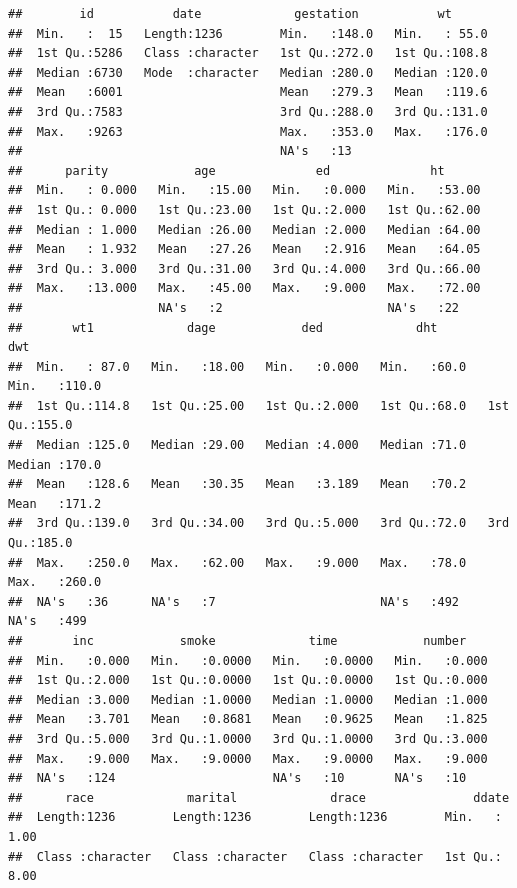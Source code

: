 \documentclass[
]{book}
\begin{document}
\begin{verbatim}
##        id           date             gestation           wt       
##  Min.   :  15   Length:1236        Min.   :148.0   Min.   : 55.0  
##  1st Qu.:5286   Class :character   1st Qu.:272.0   1st Qu.:108.8  
##  Median :6730   Mode  :character   Median :280.0   Median :120.0  
##  Mean   :6001                      Mean   :279.3   Mean   :119.6  
##  3rd Qu.:7583                      3rd Qu.:288.0   3rd Qu.:131.0  
##  Max.   :9263                      Max.   :353.0   Max.   :176.0  
##                                    NA's   :13                     
##      parity            age              ed              ht       
##  Min.   : 0.000   Min.   :15.00   Min.   :0.000   Min.   :53.00  
##  1st Qu.: 0.000   1st Qu.:23.00   1st Qu.:2.000   1st Qu.:62.00  
##  Median : 1.000   Median :26.00   Median :2.000   Median :64.00  
##  Mean   : 1.932   Mean   :27.26   Mean   :2.916   Mean   :64.05  
##  3rd Qu.: 3.000   3rd Qu.:31.00   3rd Qu.:4.000   3rd Qu.:66.00  
##  Max.   :13.000   Max.   :45.00   Max.   :9.000   Max.   :72.00  
##                   NA's   :2                       NA's   :22     
##       wt1             dage            ded             dht            dwt       
##  Min.   : 87.0   Min.   :18.00   Min.   :0.000   Min.   :60.0   Min.   :110.0  
##  1st Qu.:114.8   1st Qu.:25.00   1st Qu.:2.000   1st Qu.:68.0   1st Qu.:155.0  
##  Median :125.0   Median :29.00   Median :4.000   Median :71.0   Median :170.0  
##  Mean   :128.6   Mean   :30.35   Mean   :3.189   Mean   :70.2   Mean   :171.2  
##  3rd Qu.:139.0   3rd Qu.:34.00   3rd Qu.:5.000   3rd Qu.:72.0   3rd Qu.:185.0  
##  Max.   :250.0   Max.   :62.00   Max.   :9.000   Max.   :78.0   Max.   :260.0  
##  NA's   :36      NA's   :7                       NA's   :492    NA's   :499    
##       inc            smoke             time            number     
##  Min.   :0.000   Min.   :0.0000   Min.   :0.0000   Min.   :0.000  
##  1st Qu.:2.000   1st Qu.:0.0000   1st Qu.:0.0000   1st Qu.:0.000  
##  Median :3.000   Median :1.0000   Median :1.0000   Median :1.000  
##  Mean   :3.701   Mean   :0.8681   Mean   :0.9625   Mean   :1.825  
##  3rd Qu.:5.000   3rd Qu.:1.0000   3rd Qu.:1.0000   3rd Qu.:3.000  
##  Max.   :9.000   Max.   :9.0000   Max.   :9.0000   Max.   :9.000  
##  NA's   :124                      NA's   :10       NA's   :10     
##      race             marital             drace               ddate      
##  Length:1236        Length:1236        Length:1236        Min.   : 1.00  
##  Class :character   Class :character   Class :character   1st Qu.: 8.00  

\end{verbatim}
\end{document}
